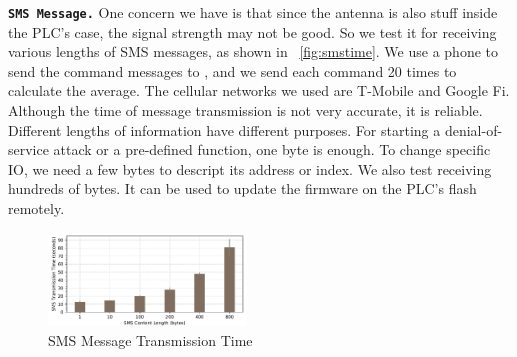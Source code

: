 %


\texttt{\textbf{SMS Message.}} One concern we have is that since the antenna is also stuff inside the PLC's case, the signal strength may not be good. So we test it for receiving various lengths of SMS messages, as shown in ~\autoref{fig:smstime}. We use a phone to send the command messages to \name, and we send each command 20 times to calculate the average. The cellular networks we used are T-Mobile and Google Fi. Although the time of message transmission is not very accurate, it is reliable. Different lengths of information have different purposes. For starting a denial-of-service attack or a pre-defined function, one byte is enough. To change specific IO, we need a few bytes to descript its address or index. We also test receiving hundreds of bytes. It can be used to update the firmware on the PLC's flash remotely.

\begin{figure}[th]
	\includegraphics[width=0.47\textwidth]{figures/smstime}
	\centering
	\caption{SMS Message Transmission Time}
	\label{fig:smstime}
\end{figure}

